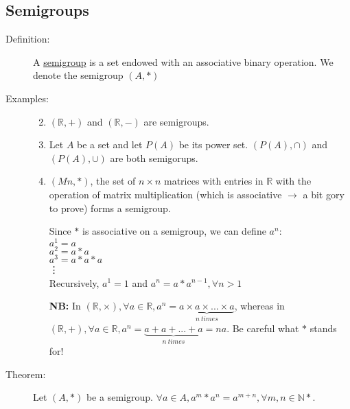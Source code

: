 \documentclass[10pt]{article}
\begin{document}
	\subsection{Semigroups}
	\begin{description}
		\item[Definition:] A \underline{semigroup} is a set endowed with an associative binary operation. We denote the semigroup $(A, *)$
		\item[Examples:]
		\begin{enumerate}
			\item[]
			\item $(\mathbb{R}, +)$ and $(\mathbb{R}, -)$ are semigroups.
			\item Let $A$ be a set and let $P(A)$ be its power set. $(P(A), \cap)$ and $(P(A), \cup)$ are both semigorups.
			\item $(Mn, *)$, the set of $n\times n$ matrices with entries in $\mathbb{R}$ with the operation of matrix multiplication (which is associative $\rightarrow$ a bit gory to prove) forms a semigroup.
			\item[] Since $*$ is associative on a semigroup, we can define $a^n:$\\
			$a^1 = a$ \\
			$a^2 = a*a$\\
			$a^3 = a*a*a$\\
			\vdots \\
			Recursively, $a^1=1$ and $a^n=a*a^{n-1}, \forall n > 1$
			\item[\textbf{NB:}] In $(\mathbb{R}, \times), \forall a \in \mathbb{R}, a^n = \underset{n\: times}{\underbrace{a \times a \times ... \times a}}$, whereas in $(\mathbb{R}, +), \forall a \in \mathbb{R}, a^n = \underset{n\: times}{\underbrace{a + a + ... + a}}=na$. Be careful what $*$ stands for!
		\end{enumerate}
		\item[Theorem:] Let $(A, *)$ be a semigroup. $\forall a \in A, a^m * a^n = a^{m+n}, \forall m, n \in \mathbb{N*}$.
\end{description}
\end{document}
